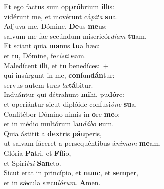 \evenverse Et ego factus sum op\textbf{pró}brium \textbf{il}lis:~\*\\
\evenverse vidérunt me, et movérunt cá\textit{pi}\textit{ta} \textbf{su}a.\\
\oddverse Adjuva me, Dómine, \textbf{De}us \textbf{me}us:~\*\\
\oddverse salvum me fac secúndum misericór\textit{di}\textit{am} \textbf{tu}am.\\
\evenverse Et sciant quia \textbf{ma}nus \textbf{tu}a hæc:~\*\\
\evenverse et tu, Dómine, fe\textit{cí}\textit{sti} \textbf{e}am.\\
\oddverse Maledícent illi, et tu benedíces:~+\\
\oddverse  qui insúrgunt in me, \textbf{con}fun\textbf{dán}tur:~\*\\
\oddverse servus autem tu\textit{us} \textit{læ}\textbf{tá}bitur.\\
\evenverse Induántur qui détrahunt \textbf{mi}hi, pu\textbf{dó}re:~\*\\
\evenverse et operiántur sicut diplóide confusi\textit{ó}\textit{ne} \textbf{su}a.\\
\oddverse Confitébor Dómino nimis in \textbf{o}re \textbf{me}o:~\*\\
\oddverse et in médio multórum lau\textit{dá}\textit{bo} \textbf{e}um.\\
\evenverse Quia ástitit a \textbf{dex}tris \textbf{páu}peris,~\*\\
\evenverse ut salvam fáceret a persequéntibus á\textit{ni}\textit{mam} \textbf{me}am.\\
\oddverse Glória \textbf{Pa}tri, et \textbf{Fí}lio,~\*\\
\oddverse et Spirí\textit{tu}\textit{i} \textbf{San}cto.\\
\evenverse Sicut erat in princípio, et \textbf{nunc}, et \textbf{sem}per,~\*\\
\evenverse et in sǽcula sæcu\textit{ló}\textit{rum}. \textbf{A}men.\\
